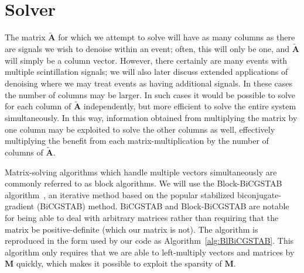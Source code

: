 \section{Solver}

The matrix $\mathbf{\widetilde{A}}$ for which we attempt to solve will have as many columns as there are signals we wish to denoise within an event; often, this will only be one, and $\mathbf{\widetilde{A}}$ will simply be a column vector.  However, there certainly are many events with multiple scintillation signals; we will also later discuss extended applications of denoising where we may treat events as having additional signals.  In these cases the number of columns may be larger.  In such cases it would be possible to solve for each column of $\mathbf{\widetilde{A}}$ independently, but more efficient to solve the entire system simultaneously.  In this way, information obtained from multiplying the matrix by one column may be exploited to solve the other columns as well, effectively multiplying the benefit from each matrix-multiplication by the number of columns of $\mathbf{\widetilde{A}}$.

Matrix-solving algorithms which handle multiple vectors simultaneously are commonly referred to as block algorithms.  We will use the Block-BiCGSTAB algorithm~\cite{BlBiCGSTAB}, an iterative method based on the popular stabilized biconjugate-gradient (BiCGSTAB) method.  BiCGSTAB and Block-BiCGSTAB are notable for being able to deal with arbitrary matrices rather than requiring that the matrix be positive-definite (which our matrix is not).  The algorithm is reproduced in the form used by our code as Algorithm~\ref{alg:BlBiCGSTAB}.  This algorithm only requires that we are able to left-multiply vectors and matrices by $\mathbf{M}$ quickly, which makes it possible to exploit the sparsity of $\mathbf{M}$.


